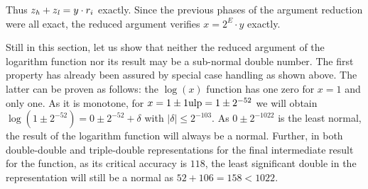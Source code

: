 Thus $z_{\mathit{h}} + z_{\mathit{l}} = y \cdot r_i$ exactly. Since the previous phases of the argument reduction were all exact, the reduced argument
verifies $x = 2^{E} \cdot y$ exactly.

Still in this section, let us show that neither the reduced argument of the logarithm function nor its result may be
a sub-normal double number. The first property has already been assured by special case handling as shown above. The 
latter can be proven as follows: the $\log\left( x \right)$ function has one zero for $x = 1$ and only one. 
As it is monotone, for $x = 1 \pm 1 \mathrm{ulp} = 1 \pm 2^{-52}$ we will obtain $\log\left( 1 \pm 2^{-52} \right) = 0 \pm 2^{-52} + \delta$ 
with 
$\left \vert \delta \right \vert \leq 2^{-103}$. As $0 \pm 2^{-1022}$ is the least normal, the result of the logarithm function will
always be a normal. Further, in both double-double and triple-double representations for the final intermediate result
for the function, as its critical accuracy is $118$, the least significant double in the representation will still be
a normal as $52 + 106 = 158 < 1022$. 
